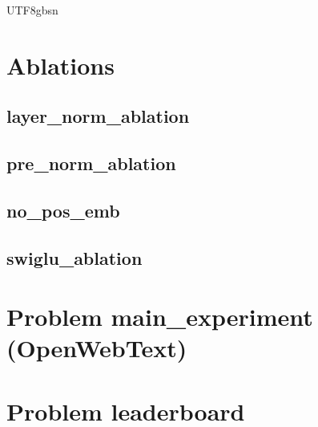 \documentclass{article}
\begin{document}
\begin{CJK}{UTF8}{gbsn}
\section*{Ablations}

\subsection*{layer\_norm\_ablation}

\subsection*{pre\_norm\_ablation}

\subsection*{no\_pos\_emb}

\subsection*{swiglu\_ablation}

\section*{Problem main\_experiment (OpenWebText)}

\section*{Problem leaderboard}
\end{CJK}
\end{document}
